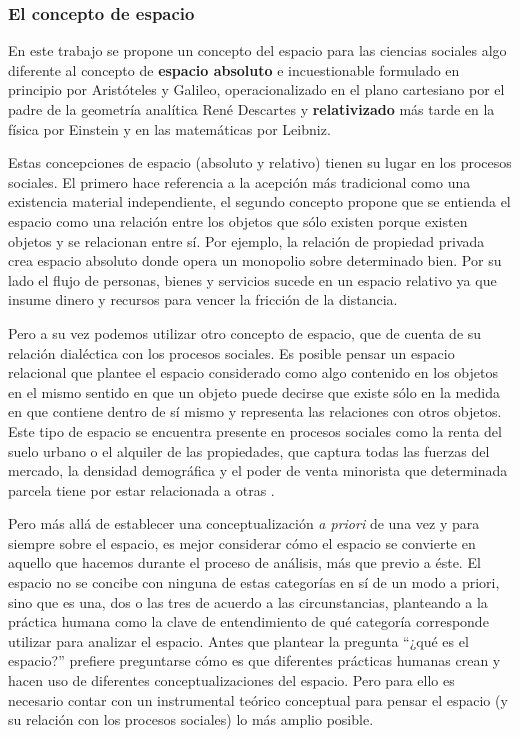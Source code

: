 \subsubsection{El concepto de espacio}


En este trabajo se propone un concepto del espacio para las ciencias sociales algo diferente al concepto de \textbf{espacio absoluto} e incuestionable formulado en principio por Aristóteles y Galileo, operacionalizado en el plano cartesiano por el padre de la geometría analítica René Descartes y \textbf{relativizado } más tarde en la física por Einstein y en las matemáticas por Leibniz.  

Estas concepciones de espacio (absoluto y relativo) tienen su lugar en los procesos sociales. El primero hace referencia a la acepción más tradicional como una existencia material independiente, el segundo concepto propone que se entienda el espacio como una relación entre los objetos que sólo existen porque existen objetos y se relacionan entre sí. Por ejemplo, la relación de propiedad privada crea espacio absoluto donde opera un monopolio sobre determinado bien. Por su lado el flujo de personas, bienes y servicios sucede en un espacio relativo ya que insume dinero y recursos para vencer la fricción de la distancia.

Pero a su vez podemos utilizar otro concepto de espacio, que de cuenta de su relación dialéctica con los procesos sociales. Es posible pensar un espacio relacional que plantee el espacio considerado como algo contenido en los objetos en el mismo sentido en que un objeto puede decirse que existe sólo en la medida en que contiene dentro de sí mismo y representa las relaciones con otros objetos. Este tipo de espacio se encuentra presente en procesos sociales como la renta del suelo urbano o el alquiler de las propiedades, que captura todas las fuerzas del mercado, la densidad demográfica y el poder de venta minorista que determinada parcela tiene por estar relacionada a otras \cite[p.~13]{harvey}.

Pero más allá de establecer una conceptualización \textit{a priori} de una vez y para siempre sobre el espacio, es mejor considerar cómo el espacio se convierte en aquello que hacemos durante el proceso de análisis, más que previo a éste. El espacio no se concibe con ninguna de estas categorías en sí de un modo a priori, sino que es una, dos o las tres de acuerdo a las circunstancias, planteando a la práctica humana como la clave de entendimiento de qué categoría corresponde utilizar para analizar el espacio. Antes que plantear la pregunta “¿qué es el espacio?” prefiere preguntarse cómo es que diferentes prácticas humanas crean y hacen uso de diferentes conceptualizaciones del espacio. Pero para ello es necesario contar con un instrumental teórico conceptual para pensar el espacio (y su relación con los procesos sociales) lo más amplio posible.

